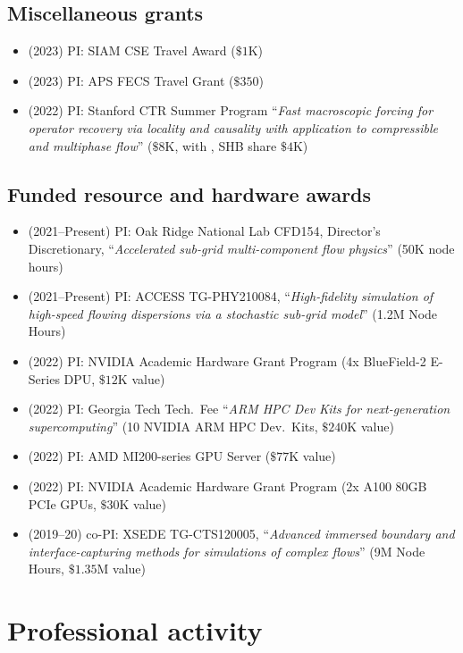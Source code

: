 \subsection{Miscellaneous grants}

\begin{itemize}
    \item (2023) PI: SIAM CSE Travel Award ($\$1$K)
    \item (2023) PI: APS FECS Travel Grant ($\$350$)
    \item (2022) PI: Stanford CTR Summer Program ``\textit{Fast macroscopic forcing for operator recovery via locality and causality with application to compressible and multiphase flow}'' ($\$8$K, with \Florian, SHB share $\$4$K)
\end{itemize}

\subsection{Funded resource and hardware awards}

\begin{itemize}
    \item (2021--Present) PI: Oak Ridge National Lab CFD154, Director's Discretionary, ``\textit{Accelerated sub-grid multi-component flow physics}'' (50K node hours)
    \item (2021--Present) PI: ACCESS TG-PHY210084, ``\textit{High-fidelity simulation of high-speed flowing dispersions via a stochastic sub-grid model}'' (1.2M Node Hours)
    \item (2022) PI: NVIDIA Academic Hardware Grant Program (4x BlueField-2 E-Series DPU, $\$12$K value)
    \item (2022) PI: Georgia Tech Tech.\ Fee ``\textit{ARM HPC Dev Kits for next-generation supercomputing}'' (10 NVIDIA ARM HPC Dev.\ Kits, $\$240$K value)
    \item (2022) PI: AMD MI200-series GPU Server ($\$77$K value)
    \item (2022) PI: NVIDIA Academic Hardware Grant Program (2x A100 80GB PCIe GPUs, $\$30$K value)
    \item (2019--20) co-PI: XSEDE TG-CTS120005, ``\textit{Advanced immersed boundary and interface-capturing methods for simulations of complex flows}'' (9M Node Hours, $\$1.35$M value)
\end{itemize}

% 

\section{Professional activity}

